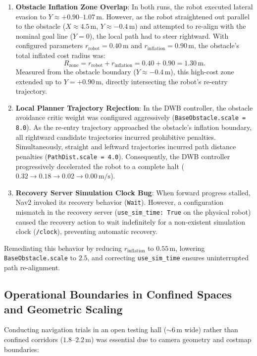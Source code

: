 \documentclass{ieeeaccess}
\begin{document}
\begin{enumerate}
  \item \textbf{Obstacle Inflation Zone Overlap}: In both runs, the robot executed lateral evasion to $Y \approx +0.90\text{--}1.07$\,m. However, as the robot straightened out parallel to the obstacle ($X \approx 4.5$\,m, $Y \approx -0.4$\,m) and attempted to re-align with the nominal goal line ($Y=0$), the local path had to steer rightward. With configured parameters $r_{\mathrm{robot}} = 0.40$\,m and $r_{\mathrm{inflation}} = 0.90$\,m, the obstacle's total inflated cost radius was:
  \begin{equation}
    R_{\mathrm{zone}} = r_{\mathrm{robot}} + r_{\mathrm{inflation}} = 0.40 + 0.90 = 1.30\,\text{m}.
  \end{equation}
  Measured from the obstacle boundary ($Y \approx -0.4$\,m), this high-cost zone extended up to $Y = +0.90$\,m, directly intersecting the robot's re-entry trajectory.
  \item \textbf{Local Planner Trajectory Rejection}: In the DWB controller, the obstacle avoidance critic weight was configured aggressively (\texttt{BaseObstacle.scale}\allowbreak\texttt{ = 8.0}). As the re-entry trajectory approached the obstacle's inflation boundary, all rightward candidate trajectories incurred prohibitive penalties. Simultaneously, straight and leftward trajectories incurred path distance penalties (\texttt{PathDist.scale}\allowbreak\texttt{ = 4.0}). Consequently, the DWB controller progressively decelerated the robot to a complete halt ($0.32 \rightarrow 0.18 \rightarrow 0.02 \rightarrow 0.00\,\text{m/s}$).
  \item \textbf{Recovery Server Simulation Clock Bug}: When forward progress stalled, Nav2 invoked its recovery behavior (\texttt{Wait}). However, a configuration mismatch in the recovery server (\texttt{use\_sim\_time: True} on the physical robot) caused the recovery action to wait indefinitely for a non-existent simulation clock (\texttt{/clock}), preventing automatic recovery.
\end{enumerate}
Remediating this behavior by reducing $r_{\mathrm{inflation}}$ to $0.55$\,m, lowering \texttt{BaseObstacle.scale} to $2.5$, and correcting \texttt{use\_sim\_time} ensures uninterrupted path re-alignment.

\subsection{Operational Boundaries in Confined Spaces and Geometric Scaling}
\label{subsec:corridor_limitations}
Conducting navigation trials in an open testing hall ($\sim 6$\,m wide) rather than confined corridors ($1.8\text{--}2.2$\,m) was essential due to camera geometry and costmap boundaries:
\end{document}

